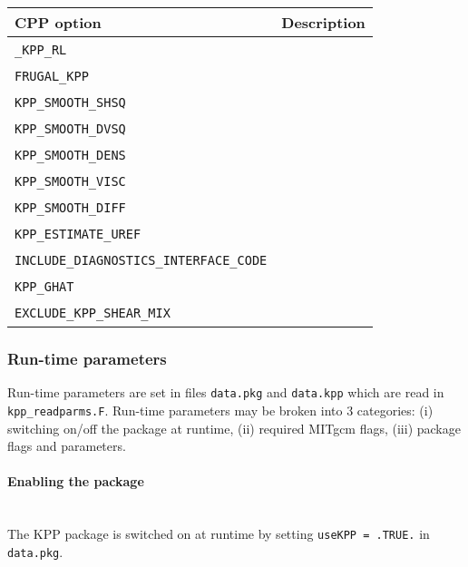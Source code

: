 \begin{table}[!ht]
\centering
  \label{tab:pkg:kpp:cpp}
  {\footnotesize
    \begin{tabular}{|l|l|}
      \hline 
      \textbf{CPP option}  &  \textbf{Description}  \\
      \hline \hline
        \texttt{\_KPP\_RL} & 
          ~ \\
        \texttt{FRUGAL\_KPP} & 
          ~ \\
        \texttt{KPP\_SMOOTH\_SHSQ} & 
          ~ \\
        \texttt{KPP\_SMOOTH\_DVSQ} & 
          ~ \\
        \texttt{KPP\_SMOOTH\_DENS} & 
          ~ \\
        \texttt{KPP\_SMOOTH\_VISC} & 
          ~ \\
        \texttt{KPP\_SMOOTH\_DIFF} & 
          ~ \\
        \texttt{KPP\_ESTIMATE\_UREF} & 
          ~ \\
        \texttt{INCLUDE\_DIAGNOSTICS\_INTERFACE\_CODE} & 
          ~ \\
        \texttt{KPP\_GHAT} & 
          ~ \\
        \texttt{EXCLUDE\_KPP\_SHEAR\_MIX} & 
          ~ \\
      \hline
    \end{tabular}
  }
  \caption{~}
\end{table}



\subsubsection{Run-time parameters
\label{sec:pkg:kpp:runtime}}

Run-time parameters are set in files 
\texttt{data.pkg} and \texttt{data.kpp}
which are read in \texttt{kpp\_readparms.F}.
Run-time parameters may be broken into 3 categories:
(i) switching on/off the package at runtime,
(ii) required MITgcm flags,
(iii) package flags and parameters.

\paragraph{Enabling the package}
~ \\
%
The KPP package is switched on at runtime by setting
\texttt{useKPP = .TRUE.} in \texttt{data.pkg}.

